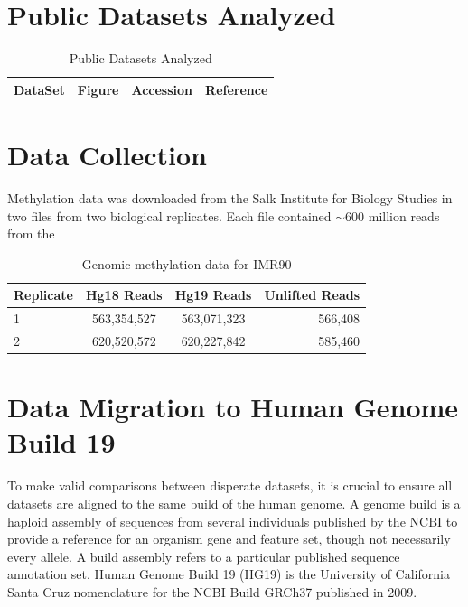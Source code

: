 \documentclass[phd,tocprelim]{cornell}
\begin{document}
\begin{figure}

\end{figure}



%
%

\appendix
\appendixpage%
\addappheadtotoc%

\chapter{Public Datasets Analyzed}

\begin{table}
  \centering
  \begin{tabular}{lccr}
    \hline
    DataSet & Figure & Accession & Reference \\ \hline
    \hline
  \end{tabular}
  \caption{Public Datasets Analyzed}
\end{table}


\chapter{Data Collection}

Methylation data was downloaded from the Salk Institute for Biology Studies in
two files from two biological replicates.  Each file contained $\sim600$ million
reads from the

\begin{table}
  \centering
  \begin{tabular}{lccr}
    \hline
    Replicate & Hg18 Reads & Hg19 Reads & Unlifted Reads \\ \hline
    1 & 563,354,527 & 563,071,323 & 566,408 \\
    2 & 620,520,572 & 620,227,842 & 585,460 \\
    \hline
  \end{tabular}
  \caption{Genomic methylation data for IMR90}
\end{table}

\chapter{Data Migration to Human Genome Build 19}

To make valid comparisons between disperate datasets, it is crucial to ensure all datasets are aligned to the same
build of the human genome.  A genome build is a haploid assembly of sequences from several individuals published by
the NCBI to provide a reference for an organism gene and feature set, though not necessarily every allele.  A build assembly
refers to a particular published sequence annotation set.  Human Genome Build 19 (HG19) is the University of California Santa
Cruz nomenclature for the NCBI Build GRCh37 published in 2009\cite{NCBI2015}.
\end{document}
